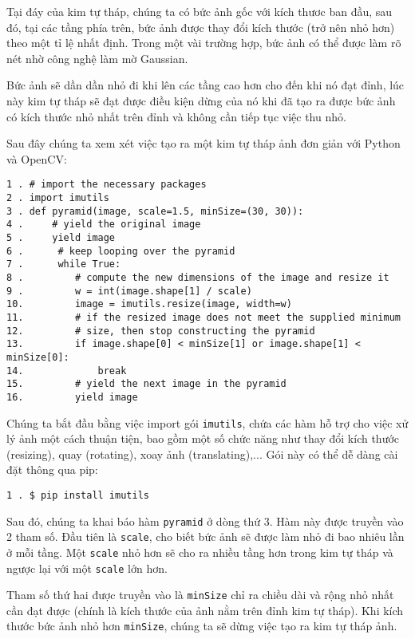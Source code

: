 \documentclass[12pt,a4paper]{article}
\begin{document}
Tại đáy của kim tự tháp, chúng ta có bức ảnh gốc với kích thươc ban đầu, sau đó, tại các tầng phía trên, bức ảnh được thay đổi kích thước (trở nên nhỏ hơn) theo một tỉ lệ nhất định. Trong một vài trường hợp, bức ảnh có thể được làm rõ nét nhờ công nghệ làm mờ Gaussian.

Bức ảnh sẽ dần dần nhỏ đi khi lên các tầng cao hơn cho đến khi nó đạt đỉnh, lúc này kim tự tháp sẽ đạt được điều kiện dừng của nó khi đã tạo ra được bức ảnh có kích thước nhỏ nhất trên đỉnh và không cần tiếp tục việc thu nhỏ.

Sau đây chúng ta xem xét việc tạo ra một kim tự tháp ảnh đơn giản với Python và OpenCV:


\begin{lstlisting}
1 . # import the necessary packages
2 . import imutils
3 . def pyramid(image, scale=1.5, minSize=(30, 30)):
4 .     # yield the original image
5 .     yield image
6 .      # keep looping over the pyramid
7 .      while True:
8 .         # compute the new dimensions of the image and resize it
9 .         w = int(image.shape[1] / scale)
10.		    image = imutils.resize(image, width=w)
11.		    # if the resized image does not meet the supplied minimum
12.		    # size, then stop constructing the pyramid
13.		    if image.shape[0] < minSize[1] or image.shape[1] < minSize[0]:
14.			    break
15.		    # yield the next image in the pyramid
16.		    yield image
\end{lstlisting}

Chúng ta bắt đầu bằng việc import gói \verb|imutils|, chứa các hàm hỗ trợ cho việc xử lý ảnh một cách thuận tiện, bao gồm một số chức năng như thay đổi kích thước (resizing), quay (rotating), xoay ảnh (translating),... Gói này có thể dễ dàng cài đặt thông qua pip:


\begin{lstlisting}
1 . $ pip install imutils

\end{lstlisting}

Sau đó, chúng ta khai báo hàm \verb|pyramid| ở dòng thứ 3. Hàm này được truyền vào 2 tham số. Đầu tiên là \verb|scale|, cho biết bức ảnh sẽ được làm nhỏ đi bao nhiêu lần ở mỗi tầng. Một \verb|scale| nhỏ hơn sẽ cho ra nhiều tầng hơn trong kim tự tháp và ngược lại với một \verb|scale| lớn hơn.

Tham số thứ hai được truyền vào là \verb|minSize| chỉ ra chiều dài và rộng nhỏ nhất cần đạt được (chính là kích thước của ảnh nằm trên đỉnh kim tự tháp). Khi kích thước bức ảnh nhỏ hơn \verb|minSize|, chúng ta sẽ dừng việc tạo ra kim tự tháp ảnh.
\end{document}
